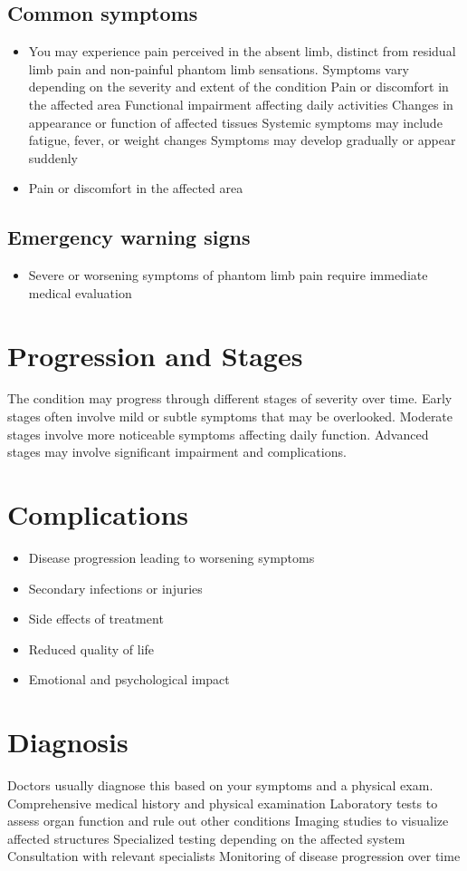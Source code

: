 \subsection{Common symptoms}
\begin{itemize}[noitemsep]
  \item You may experience pain perceived in the absent limb, distinct from residual limb pain and non-painful phantom limb sensations. Symptoms vary depending on the severity and extent of the condition Pain or discomfort in the affected area Functional impairment affecting daily activities Changes in appearance or function of affected tissues Systemic symptoms may include fatigue, fever, or weight changes Symptoms may develop gradually or appear suddenly
  \item Pain or discomfort in the affected area
  \end{itemize}

\subsection{Emergency warning signs}
\begin{itemize}[noitemsep]
  \item Severe or worsening symptoms of phantom limb pain require immediate medical evaluation
\end{itemize}
\section{Progression and Stages}
The condition may progress through different stages of severity over time. Early stages often involve mild or subtle symptoms that may be overlooked. Moderate stages involve more noticeable symptoms affecting daily function. Advanced stages may involve significant impairment and complications.
\section{Complications}
\begin{itemize}[noitemsep]
  \item Disease progression leading to worsening symptoms
  \item Secondary infections or injuries
  \item Side effects of treatment
  \item Reduced quality of life
  \item Emotional and psychological impact
\end{itemize}
\section{Diagnosis}
Doctors usually diagnose this based on your symptoms and a physical exam. Comprehensive medical history and physical examination Laboratory tests to assess organ function and rule out other conditions Imaging studies to visualize affected structures Specialized testing depending on the affected system Consultation with relevant specialists Monitoring of disease progression over time

